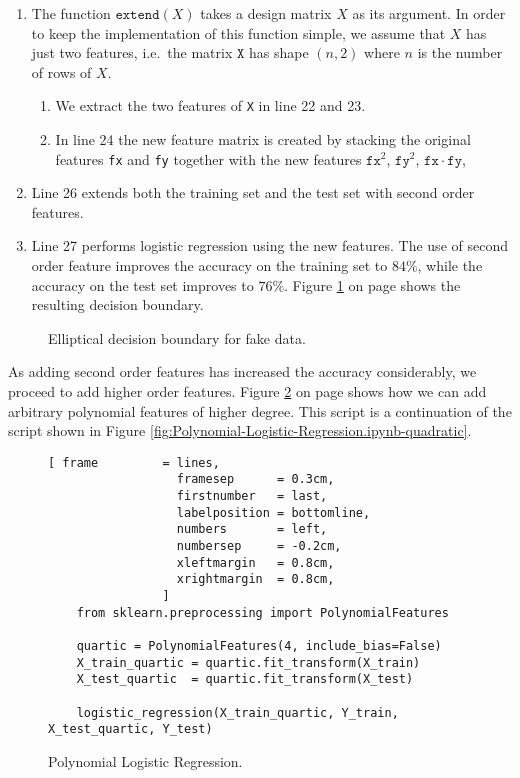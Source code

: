 \begin{enumerate}
\item The function $\texttt{extend}(X)$ takes a design matrix $X$ as its argument.  In order to keep the
      implementation of this function simple, we assume that $X$ has just two features, i.e.~the matrix
      $\texttt{X}$ has shape $(n, 2)$ where $n$ is the number of rows of $X$.
      \begin{enumerate}
      \item We extract the two features of \texttt{X} in line 22 and 23.
      \item In line 24 the new feature matrix is created by stacking the original features \texttt{fx} and
            \texttt{fy} together with the new features $\mathtt{fx}^2$, $\mathtt{fy}^2$, $\mathtt{fx} \cdot \mathtt{fy}$, 
      \end{enumerate}
\item Line 26 extends both the training set and the test set with second order features.
\item Line 27 performs logistic regression using the new features.
      The use of second order feature improves the accuracy on the training set to $84\%$, while the accuracy
      on the test set improves to $76\%$.
      Figure \ref{fig:fake-data-ellipse.pdf} on page \pageref{fig:fake-data-ellipse.pdf} shows the resulting
      decision boundary.
\end{enumerate}


\begin{figure}[!th]
\caption{Elliptical decision boundary for fake data.}
\label{fig:fake-data-ellipse.pdf}
\end{figure}


As adding second order features has increased the accuracy considerably, we proceed to add higher order features.
Figure \ref{fig:Polynomial-Logistic-Regression.ipynb-quartic} on page
\pageref{fig:Polynomial-Logistic-Regression.ipynb-quartic} shows how we can add arbitrary polynomial features
of higher degree.  This script is a continuation of the script shown in Figure \ref{fig:Polynomial-Logistic-Regression.ipynb-quadratic}.

\begin{figure}[!ht]
\centering
\begin{Verbatim}[ frame         = lines, 
                  framesep      = 0.3cm, 
                  firstnumber   = last,
                  labelposition = bottomline,
                  numbers       = left,
                  numbersep     = -0.2cm,
                  xleftmargin   = 0.8cm,
                  xrightmargin  = 0.8cm,
                ]
    from sklearn.preprocessing import PolynomialFeatures

    quartic = PolynomialFeatures(4, include_bias=False)
    X_train_quartic = quartic.fit_transform(X_train)
    X_test_quartic  = quartic.fit_transform(X_test)

    logistic_regression(X_train_quartic, Y_train, X_test_quartic, Y_test)
\end{Verbatim}
\vspace*{-0.3cm}
\caption{Polynomial Logistic Regression.}
\label{fig:Polynomial-Logistic-Regression.ipynb-quartic}
\end{figure}

